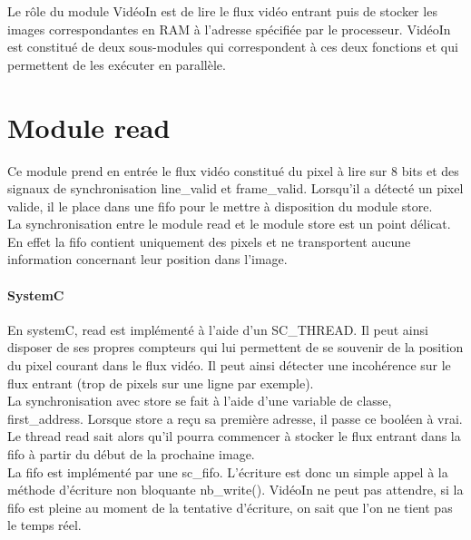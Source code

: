 \documentclass[a4paper,12pt]{report}
\begin{document}
{{                               Le rôle du module VidéoIn est de lire le flux vidéo entrant puis de stocker les images correspondantes en RAM à l'adresse spécifiée par le processeur.
                               VidéoIn est constitué de deux sous-modules qui correspondent à ces deux fonctions et qui permettent de les exécuter en parallèle.


                               \section*{Module read}
                               Ce module prend en entrée le flux vidéo constitué du pixel à lire sur 8 bits et des signaux de synchronisation line\_valid et frame\_valid.
                               Lorsqu'il a détecté un pixel valide, il le place dans une fifo pour le mettre à disposition du module store.\\
                               La synchronisation entre le module read et le module store est un point délicat.
                               En effet la fifo contient uniquement des pixels et ne transportent aucune information concernant leur position dans l'image.

                               \paragraph{SystemC}
                               En systemC, read est implémenté à l'aide d'un SC\_THREAD.
                               Il peut ainsi disposer de ses propres compteurs qui lui permettent de se souvenir de la position
                               du pixel courant dans le flux vidéo.
                               Il peut ainsi détecter une incohérence sur le flux entrant (trop de pixels sur une ligne par exemple).\\
                               La synchronisation avec store se fait à l'aide d'une variable de classe, first\_address.
                               Lorsque store a reçu sa première adresse, il passe ce booléen à vrai.
                               Le thread read sait alors qu'il pourra commencer à stocker le flux entrant dans la fifo à partir du début de la prochaine image.\\
                               La fifo est implémenté par une sc\_fifo.
                               L'écriture est donc un simple appel à la méthode d'écriture non bloquante nb\_write().
                               VidéoIn ne peut pas attendre,
                               si la fifo est pleine au moment de la tentative d'écriture, on sait que l'on ne tient pas le temps réel.

}}
\end{document}
